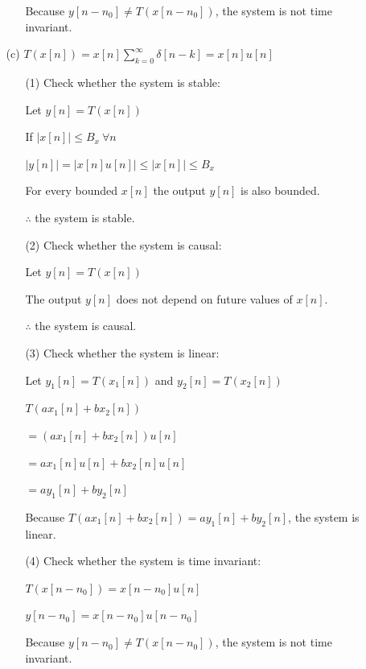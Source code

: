 \documentclass[fleqn]{article}
\begin{document}
\begin{enumerate}[nolistsep]
\begin{enumerate}[nolistsep]
\begin{enumerate}[nolistsep]
					Because $y[n-n_0] \neq T(x[n-n_0])$, the system is not time invariant.
				\end{enumerate}
					
				\item[(c)] $T(x[n]) = x[n]\sum_{k=0}^{\infty}{\delta[n-k]} = x[n]u[n]$
					
				\begin{enumerate}[nolistsep]
					\item[(1)] Check whether the system is stable:
			
					Let $y[n] = T(x[n])$
			
					If $|x[n]| \leq B_x\ \forall n$
			
					$|y[n]| = |x[n]u[n]| \leq |x[n]| \leq B_x$
			
					For every bounded $x[n]$ the output $y[n]$ is also bounded.
			
					$\therefore$ the system is stable.
					
					\item[(2)] Check whether the system is causal:
					
					Let $y[n] = T(x[n])$
					
					The output $y[n]$ does not depend on future values of $x[n]$.
					
					$\therefore$ the system is causal.
					
					\item[(3)] Check whether the system is linear:
					
					Let $y_1[n] = T(x_1[n])$ and $y_2[n] = T(x_2[n])$
					
					$T(ax_1[n] + bx_2[n])$
					
					$ = (ax_1[n] + bx_2[n])u[n]$
					
					$ = ax_1[n]u[n] + bx_2[n]u[n]$
					
					$ = ay_1[n] + by_2[n]$
					
					Because $T(ax_1[n] + bx_2[n]) = ay_1[n] + by_2[n]$, the system is linear.
					
					\item[(4)] Check whether the system is time invariant:
					
					$T(x[n-n_0]) = x[n-n_0]u[n]$
					
					$y[n-n_0] = x[n-n_0]u[n-n_0]$
					
					Because $y[n-n_0] \neq T(x[n-n_0])$, the system is not time invariant.
				\end{enumerate}
			
			
			

\end{enumerate}
\end{enumerate}
\end{document}
